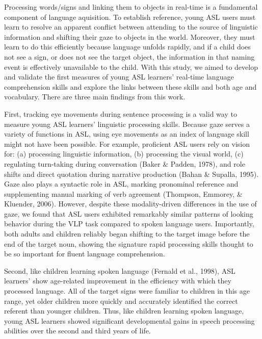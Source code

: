 \documentclass[12pt,]{article}
\begin{document}
Processing words/signs and linking them to objects in real-time is a
fundamental component of language aquisition. To establish reference,
young ASL users must learn to resolve an apparent conflict between
attending to the source of linguistic information and shifting their
gaze to objects in the world. Moreover, they must learn to do this
efficiently because language unfolds rapidly, and if a child does not
see a sign, or does not see the target object, the information in that
naming event is effectively unavailable to the child. With this study,
we aimed to develop and validate the first measures of young ASL
learners' real-time language comprehension skills and explore the links
between these skills and both age and vocabulary. There are three main
findings from this work.

First, tracking eye movements during sentence processing is a valid way
to measure young ASL learners' linguistic processing skills. Because
gaze serves a variety of functions in ASL, using eye movements as an
index of language skill might not have been possible. For example,
proficient ASL users rely on vision for: (a) processing linguistic
information, (b) processing the visual world, (c) regulating turn-taking
during conversation (Baker \& Padden, 1978), and role shifts and direct
quotation during narrative production (Bahan \& Supalla, 1995). Gaze
also plays a syntactic role in ASL, marking pronominal reference and
supplementing manual marking of verb agreement (Thompson, Emmorey, \&
Kluender, 2006). However, despite these modality-driven differences in
the use of gaze, we found that ASL users exhibited remarkably similar
patterns of looking behavior during the VLP task compared to spoken
language users. Importantly, both adults and children reliably began
shifting to the target image before the end of the target noun, showing
the signature rapid processing skills thought to be so important for
fluent language comprehension.

Second, like children learning spoken language (Fernald et al., 1998),
ASL learners' show age-related improvement in the efficiency with which
they processed language. All of the target signs were familiar to
children in this age range, yet older children more quickly and
accurately identified the correct referent than younger children. Thus,
like children learning spoken language, young ASL learners showed
significant developmental gains in speech processing abilities over the
second and third years of life.
\end{document}
